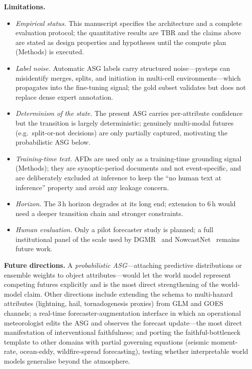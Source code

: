 \documentclass[fleqn,10pt]{wlscirep}
\begin{document}
\textbf{Limitations.}
\begin{itemize}[leftmargin=1.2em,itemsep=2pt,topsep=3pt]
\item \emph{Empirical status.} This manuscript specifies the architecture and a complete evaluation protocol; the quantitative results are TBR and the claims above are stated as design properties and hypotheses until the compute plan (Methods) is executed.
\item \emph{Label noise.} Automatic ASG labels carry structured noise---pysteps can misidentify merges, splits, and initiation in multi-cell environments---which propagates into the fine-tuning signal; the gold subset validates but does not replace dense expert annotation.
\item \emph{Determinism of the state.} The present ASG carries per-attribute confidence but the transition is largely deterministic; genuinely multi-modal futures (e.g.\ split-or-not decisions) are only partially captured, motivating the probabilistic ASG below.
\item \emph{Training-time text.} AFDs are used only as a training-time grounding signal (Methods); they are synoptic-period documents and not event-specific, and are deliberately excluded at inference to keep the ``no human text at inference'' property and avoid any leakage concern.
\item \emph{Horizon.} The 3\,h horizon degrades at its long end; extension to 6\,h would need a deeper transition chain and stronger constraints.
\item \emph{Human evaluation.} Only a pilot forecaster study is planned; a full institutional panel of the scale used by DGMR~\cite{ravuri2021dgmr} and NowcastNet~\cite{zhang2023nowcastnet} remains future work.
\end{itemize}

\textbf{Future directions.}
A \emph{probabilistic ASG}---attaching predictive distributions or ensemble weights to object attributes---would let the world model represent competing futures explicitly and is the most direct strengthening of the world-model claim.
Other directions include extending the schema to multi-hazard attributes (lightning, hail, tornadogenesis proxies) from GLM and GOES channels; a real-time forecaster-augmentation interface in which an operational meteorologist edits the ASG and observes the forecast update---the most direct manifestation of interventional faithfulness; and porting the faithful-bottleneck template to other domains with partial governing equations (seismic moment-rate, ocean-eddy, wildfire-spread forecasting), testing whether interpretable world models generalise beyond the atmosphere.
\end{document}
